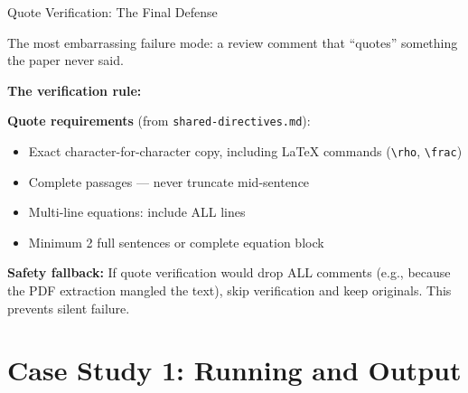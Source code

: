 \documentclass[10pt,english,aspectratio=169]{beamer}
\begin{document}
\begin{frame}{Quote Verification: The Final Defense}

The most embarrassing failure mode: a review comment that ``quotes'' something the paper never said.

\vspace{0.3cm}
\textbf{The verification rule:}
\begin{center}
\end{center}

\vspace{0.3cm}
\textbf{Quote requirements} (from \texttt{shared-directives.md}):
\begin{itemize}
    \item Exact character-for-character copy, including \LaTeX{} commands (\texttt{\textbackslash rho}, \texttt{\textbackslash frac})
    \item Complete passages --- never truncate mid-sentence
    \item Multi-line equations: include ALL lines
    \item Minimum 2 full sentences or complete equation block
\end{itemize}

\vspace{0.3cm}
\textbf{Safety fallback:} If quote verification would drop ALL comments (e.g., because the PDF extraction mangled the text), skip verification and keep originals. This prevents silent failure.

\end{frame}


\section{Case Study 1: Running and Output}
\end{document}
